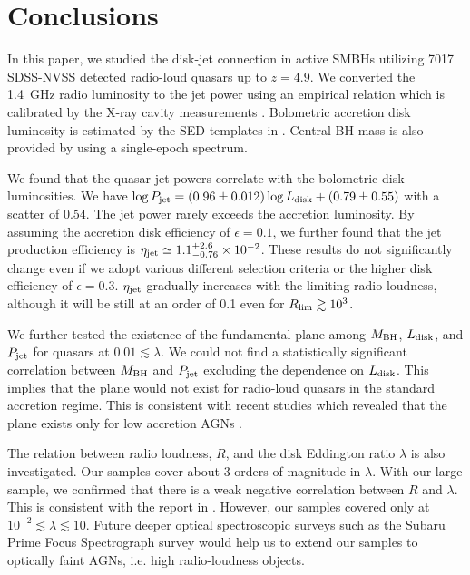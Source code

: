 \documentclass[preprint2,twocolappendix]{aastex6}
\begin{document}
\section{Conclusions}
\label{sec:con}
In this paper, we studied the disk-jet connection in active SMBHs utilizing 7017 SDSS-NVSS detected radio-loud quasars up to $z=4.9$. We converted the 1.4~GHz radio luminosity to the jet power using an empirical relation \citep{wil99} which is calibrated by the X-ray cavity measurements \citep{wil99,god13}. Bolometric accretion disk luminosity is estimated by the SED templates in \citet{ric06}. Central BH mass is also provided by \citet{she11} using a single-epoch spectrum. 

We found that the quasar jet powers correlate with the bolometric disk luminosities. We have $\log P_{\rm jet} = (0.96\pm0.012)\log L_{\rm disk} + (0.79 \pm 0.55)$ with a scatter of 0.54. The jet power rarely exceeds the accretion luminosity. By assuming the accretion disk efficiency of $\epsilon=0.1$, we further found that the jet production efficiency is $\eta_{\rm jet}\simeq1.1_{-0.76}^{+2.6}\times10^{-2}$. These results do not significantly change even if we adopt various different selection criteria or  the higher disk efficiency of $\epsilon=0.3$. $\eta_{\rm jet}$ gradually increases with the limiting radio loudness, although it will be still at an order of 0.1 even for $R_{\rm lim}\gtrsim10^3$. 

We further tested the existence of the fundamental plane among $M_{\rm BH}$, $L_{\rm disk}$, and $P_{\rm jet}$ for quasars at $0.01\lesssim\lambda$. We could not find a statistically significant correlation between $M_{\rm BH}$ and $P_{\rm jet}$ excluding the dependence on $L_{\rm disk}$. This implies that the plane would not exist for radio-loud quasars in the standard accretion regime. This is consistent with recent studies which revealed that the plane exists only for low accretion AGNs \citep[e.g.][]{mer08,plo12}.

The relation between radio loudness, $R$, and the disk Eddington ratio $\lambda$ is also investigated. Our samples cover about 3 orders of magnitude in $\lambda$. With our large sample, we confirmed that there is a weak negative correlation between $R$ and $\lambda$. This is consistent with the report in \citet{sik07}. However, our samples covered only at $10^{-2}\lesssim\lambda\lesssim10$. Future deeper optical spectroscopic surveys such as the Subaru Prime Focus Spectrograph survey \citep{tak14,sug15} would help us to extend our samples to optically faint AGNs, i.e. high radio-loudness objects.
\end{document}
